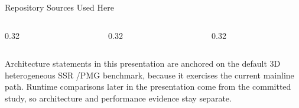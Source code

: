\documentclass[aspectratio=169,10pt]{beamer}
\begin{document}
\begin{frame}{Repository Sources Used Here}
\small
\begin{columns}[T,totalwidth=\textwidth]
\begin{column}{0.32\textwidth}
\end{column}
\begin{column}{0.32\textwidth}
\end{column}
\begin{column}{0.32\textwidth}
\end{column}
\end{columns}
\vspace{0.22cm}
\begin{softbox}
Architecture statements in this presentation are anchored on the default 3D heterogeneous SSR /PMG benchmark, because it exercises the current mainline path. Runtime comparisons later in the presentation come from the committed  study, so architecture and performance evidence stay separate.
\end{softbox}
\end{frame}

\end{document}
